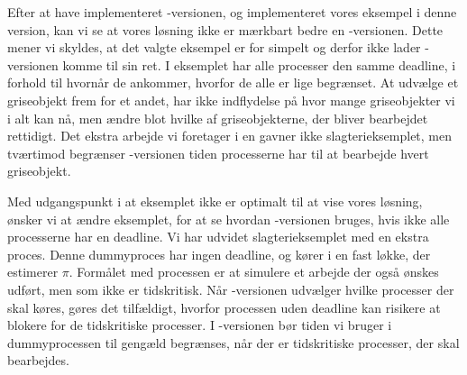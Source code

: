 


Efter at have implementeret -versionen, og implementeret vores eksempel i denne version, kan vi se at vores løsning ikke er mærkbart bedre en -versionen. Dette mener vi skyldes, at det valgte eksempel er for simpelt og derfor ikke lader -versionen komme til sin ret. I eksemplet har alle processer den samme deadline, i forhold til hvornår de ankommer, hvorfor de alle er lige begrænset. At udvælge et griseobjekt frem for et andet, har ikke indflydelse på  hvor mange griseobjekter vi i alt kan nå, men ændre blot hvilke af griseobjekterne, der bliver bearbejdet rettidigt. Det ekstra arbejde vi foretager i \sched en gavner ikke slagterieksemplet, men tværtimod begrænser -versionen tiden processerne har til at bearbejde hvert griseobjekt.

Med udgangspunkt i at eksemplet ikke er optimalt til at vise vores løsning, ønsker vi at ændre eksemplet, for at se hvordan -versionen bruges, hvis ikke alle processerne har en deadline. Vi har udvidet slagterieksemplet med en ekstra proces. Denne dummyproces har ingen deadline, og kører i en fast løkke, der estimerer $\pi$. Formålet med processen er at simulere et arbejde der også ønskes udført, men som ikke er tidskritisk. Når -versionen udvælger hvilke processer der skal køres, gøres det tilfældigt, hvorfor processen uden deadline kan risikere at blokere for de tidskritiske processer. I -versionen bør tiden vi bruger i  dummyprocessen til gengæld begrænses, når der er tidskritiske processer, der skal bearbejdes.

